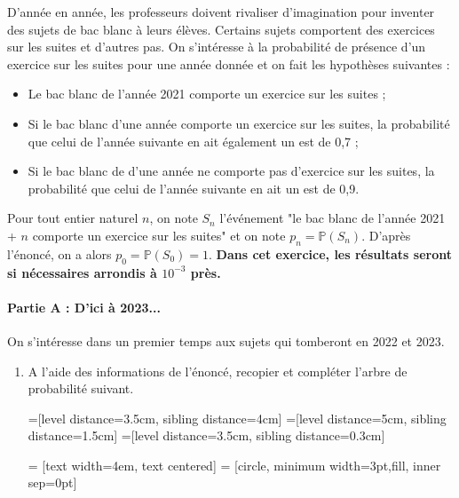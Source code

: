 \documentclass[11pt,fleqn, openany]{book} %
\begin{document}
\begin{exercise}[topic=prob01]
D'année en année, les professeurs doivent rivaliser d'imagination pour inventer des sujets de bac blanc à leurs élèves. Certains sujets comportent des exercices sur les suites et d'autres pas. On s'intéresse à la probabilité de présence d'un exercice sur les suites pour une année donnée et on fait les hypothèses suivantes :
\begin{itemize}
    \item Le bac blanc de l'année 2021 comporte un exercice sur les suites ;
    \item Si le bac blanc d'une année comporte un exercice sur les suites, la probabilité que celui de l'année suivante en ait également un est de 0,7 ;
    \item Si le bac blanc de d'une année ne comporte pas d'exercice sur les suites, la probabilité que celui de l'année suivante en ait un est de 0,9.
\end{itemize}
Pour tout entier naturel $n$, on note $S_n$ l'événement "le bac blanc de l'année 2021 + $n$ comporte un exercice sur les suites" et on note $p_n=\mathbb{P}(S_n)$. D'après l'énoncé, on a alors $p_0=\mathbb{P}(S_0)=1$. \textbf{Dans cet exercice, les résultats seront si nécessaires arrondis à $10^{-3}$ près.}


\paragraph{Partie A : D'ici à 2023...}

On s'intéresse dans un premier temps aux sujets qui tomberont en 2022 et 2023.

\begin{enumerate}
    \item A l'aide des informations de l'énoncé, recopier et compléter l'arbre de probabilité suivant.
    
=[level distance=3.5cm, sibling distance=4cm]
=[level distance=5cm, sibling distance=1.5cm]
=[level distance=3.5cm, sibling distance=0.3cm]

 = [text width=4em, text centered]
 = [circle, minimum width=3pt,fill, inner sep=0pt]



\end{enumerate}
\end{exercise}
\end{document}
